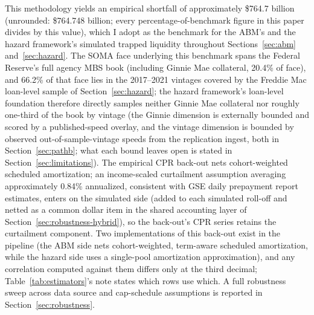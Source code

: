 \documentclass[12pt]{article}
\begin{document}
This methodology yields an empirical shortfall of approximately \$764.7 billion (unrounded: \$764.748 billion; every percentage-of-benchmark figure in this paper divides by this value), which I adopt as the benchmark for the ABM's and the hazard framework's simulated trapped liquidity throughout Sections~\ref{sec:abm} and~\ref{sec:hazard}. The SOMA face underlying this benchmark spans the Federal Reserve's full agency MBS book (including Ginnie Mae collateral, 20.4\% of face), and 66.2\% of that face lies in the 2017--2021 vintages covered by the Freddie Mac loan-level sample of Section~\ref{sec:hazard}; the hazard framework's loan-level foundation therefore directly samples neither Ginnie Mae collateral nor roughly one-third of the book by vintage (the Ginnie dimension is externally bounded and scored by a published-speed overlay, and the vintage dimension is bounded by observed out-of-sample-vintage speeds from the replication ingest, both in Section~\ref{sec:pathb}; what each bound leaves open is stated in Section~\ref{sec:limitations}). The empirical CPR back-out nets cohort-weighted scheduled amortization; an income-scaled curtailment assumption averaging approximately 0.84\% annualized, consistent with GSE daily prepayment report estimates, enters on the simulated side (added to each simulated roll-off and netted as a common dollar item in the shared accounting layer of Section~\ref{sec:robustness-hybrid}), so the back-out's CPR series retains the curtailment component. Two implementations of this back-out exist in the pipeline (the ABM side nets cohort-weighted, term-aware scheduled amortization, while the hazard side uses a single-pool amortization approximation), and any correlation computed against them differs only at the third decimal; Table~\ref{tab:estimators}'s note states which rows use which. A full robustness sweep across data source and cap-schedule assumptions is reported in Section~\ref{sec:robustness}.
\end{document}
